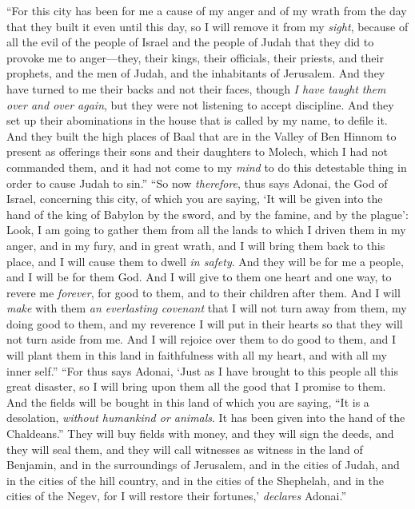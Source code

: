 \begin{biblechapter}
\verse “For this city has been for me a cause of my anger and of my wrath from the day that they built it even until this day, so I will remove it from my \textit{sight},
\verse because of all the evil of the people of Israel and the people of Judah that they did to provoke me to anger—they, their kings, their officials, their priests, and their prophets, and the men of Judah, and the inhabitants of Jerusalem.
\verse And they have turned to me their backs and not their faces, though \textit{I have taught them over and over again}, but they were not listening to accept discipline.
\verse And they set up their abominations in the house that is called by my name, to defile it.
\verse And they built the high places of Baal that are in the Valley of Ben Hinnom to present as offerings their sons and their daughters to Molech, which I had not commanded them, and it had not come to my \textit{mind} to do this detestable thing in order to cause Judah to sin.”
\verse “So now \textit{therefore}, thus says Adonai, the God of Israel, concerning this city, of which you are saying, ‘It will be given into the hand of the king of Babylon by the sword, and by the famine, and by the plague’:
\verse Look, I am going to gather them from all the lands to which I driven them in my anger, and in my fury, and in great wrath, and I will bring them back to this place, and I will cause them to dwell \textit{in safety}.
\verse And they will be for me a people, and I will be for them God.
\verse And I will give to them one heart and one way, to revere me \textit{forever}, for good to them, and to their children after them.
\verse And I will \textit{make} with them \textit{an everlasting covenant} that I will not turn away from them, my doing good to them, and my reverence I will put in their hearts so that they will not turn aside from me.
\verse And I will rejoice over them to do good to them, and I will plant them in this land in faithfulness with all my heart, and with all my inner self.”
\verse “For thus says Adonai, ‘Just as I have brought to this people all this great disaster, so I will bring upon them all the good that I promise to them.
\verse And the fields will be bought in this land of which you are saying, “It is a desolation, \textit{without humankind or animals}. It has been given into the hand of the Chaldeans.”
\verse They will buy fields with money, and they will sign the deeds, and they will seal them, and they will call witnesses as witness in the land of Benjamin, and in the surroundings of Jerusalem, and in the cities of Judah, and in the cities of the hill country, and in the cities of the Shephelah, and in the cities of the Negev, for I will restore their fortunes,’ \textit{declares} Adonai.”
\end{biblechapter}

